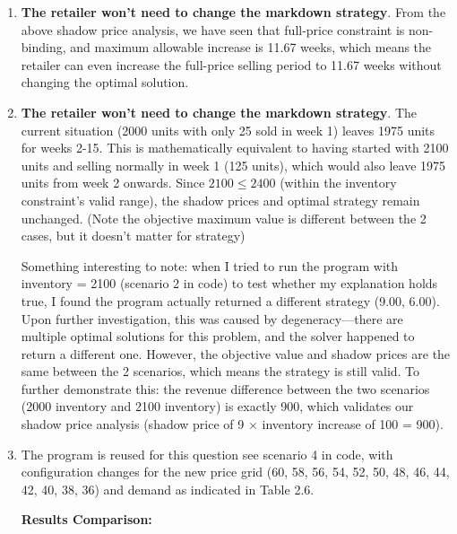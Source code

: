 \documentclass[12pt]{article}
\begin{document}
\begin{enumerate}[label= (\alph*), leftmargin=2em]
\item \textbf{The retailer won't need to change the markdown strategy}. From the above shadow price analysis, we have seen that full-price constraint is non-binding, and maximum allowable increase is 11.67 weeks, which means the retailer can even increase the full-price selling period to 11.67 weeks without changing the optimal solution.
\item \textbf{The retailer won't need to change the markdown strategy}. The current situation (2000 units with only 25 sold in week 1) leaves 1975 units for weeks 2-15. This is mathematically equivalent to having started with 2100 units and selling normally in week 1 (125 units), which would also leave 1975 units from week 2 onwards. Since $2100 \leq 2400$ (within the inventory constraint's valid range), the shadow prices and optimal strategy remain unchanged. (Note the objective maximum value is different between the 2 cases, but it doesn't matter for strategy)

Something interesting to note: when I tried to run the program with inventory = 2100 (scenario 2 in code) to test whether my explanation holds true, I found the program actually returned a different strategy (9.00, 6.00). Upon further investigation, this was caused by degeneracy—there are multiple optimal solutions for this problem, and the solver happened to return a different one. However, the objective value and shadow prices are the same between the 2 scenarios, which means the strategy is still valid. To further demonstrate this: the revenue difference between the two scenarios (2000 inventory and 2100 inventory) is exactly 900, which validates our shadow price analysis (shadow price of 9 $\times$ inventory increase of 100 = 900).
\item The program is reused for this question see scenario 4 in code, with configuration changes for the new price grid (60, 58, 56, 54, 52, 50, 48, 46, 44, 42, 40, 38, 36) and demand as indicated in Table 2.6. 

\textbf{Results Comparison:}
\begin{tcolorbox}[colback=white, colframe=gray, title=Policy Comparison: Original vs Price Grid Strategy]


\end{tcolorbox}
\end{enumerate}
\end{document}
